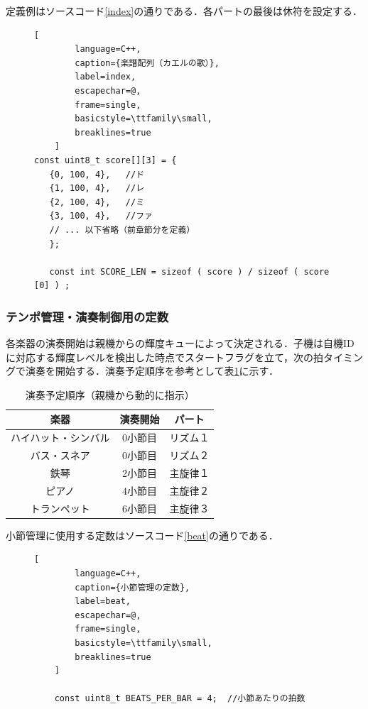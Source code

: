 定義例はソースコード\ref{index}の通りである．各パートの最後は休符を設定する．

\begin{figure}[H]
\renewcommand{\lstlistingname}{ソースコード}
    \begin{lstlisting}[
        language=C++,
        caption={楽譜配列（カエルの歌）},
        label=index,
        escapechar=@,
        frame=single,
        basicstyle=\ttfamily\small,
        breaklines=true
    ]
const uint8_t score[][3] = {
   {0, 100, 4},   //ド
   {1, 100, 4},   //レ
   {2, 100, 4},   //ミ
   {3, 100, 4},   //ファ
   // ... 以下省略（前章節分を定義）
   };
   
   const int SCORE_LEN = sizeof ( score ) / sizeof ( score [0] ) ;

   \end{lstlisting}
\end{figure}

\subsubsection{テンポ管理・演奏制御用の定数}
各楽器の演奏開始は親機からの輝度キューによって決定される．子機は自機IDに対応する輝度レベルを検出した時点でスタートフラグを立て，次の拍タイミングで演奏を開始する．演奏予定順序を参考として表\ref{offset02}に示す．
\begin{table}[H]
  \centering
  \caption{演奏予定順序（親機から動的に指示）}
  \label{offset02}
  \begin{tabular}{|c|c|c|}
\hline
楽器 & 演奏開始 & パート \\\hline \hline
ハイハット・シンバル & 0小節目 & リズム１ \\ \hline
バス・スネア & 0小節目 & リズム２ \\ \hline
鉄琴 & 2小節目 & 主旋律１ \\ \hline
ピアノ & 4小節目 & 主旋律２ \\ \hline
トランペット & 6小節目 & 主旋律３ \\ \hline
  \end{tabular}  
\end{table}
\FloatBarrier

小節管理に使用する定数はソースコード\ref{beat}の通りである．
\begin{figure}[H]
\renewcommand{\lstlistingname}{ソースコード}
    \begin{lstlisting}[
        language=C++,
        caption={小節管理の定数},
        label=beat,
        escapechar=@,
        frame=single,
        basicstyle=\ttfamily\small,
        breaklines=true
    ]
    
    const uint8_t BEATS_PER_BAR = 4;  //小節あたりの拍数
    
   \end{lstlisting}
\end{figure}

